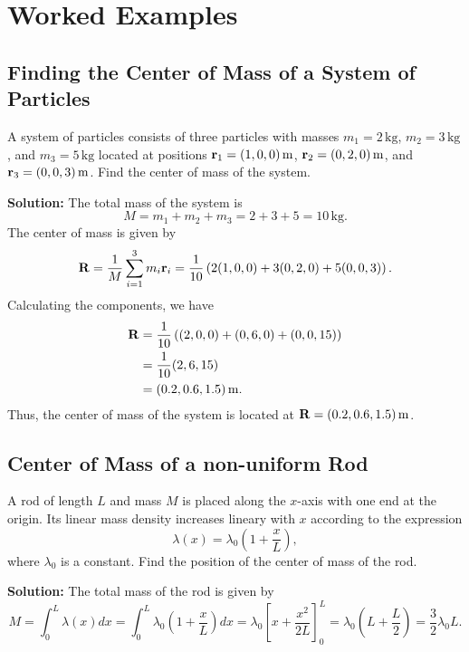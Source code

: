 \documentclass[12pt]{article}
\begin{document}
\section{Worked Examples}
\subsection{Finding the Center of Mass of a System of Particles}
A system of particles consists of three particles with masses $m_1=2\,\mathrm{kg}$, $m_2=3\,\mathrm{kg}$, and $m_3=5\,\mathrm{kg}$ located at positions $\vb{r}_1=(1,0,0)\,\mathrm{m}$, $\vb{r}_2=(0,2,0)\,\mathrm{m}$, and $\vb{r}_3=(0,0,3)\,\mathrm{m}$. Find the center of mass of the system.

\textbf{Solution:}
The total mass of the system is
\begin{equation}
    M = m_1 + m_2 + m_3 = 2 + 3 + 5 = 10\,\mathrm{kg}.
\end{equation}
The center of mass is given by
\begin{equation}
    \vb{R} = \frac{1}{M}\sum_{i=1}^{3} m_i \vb{r}_i
    = \frac{1}{10}\left(2(1,0,0) + 3(0,2,0) + 5(0,0,3)\right).
\end{equation}
Calculating the components, we have
\begin{align}
    \vb{R} &= \frac{1}{10}\left((2,0,0) + (0,6,0) + (0,0,15)\right) \\
    &= \frac{1}{10}(2,6,15) \\
    &= (0.2, 0.6, 1.5)\,\mathrm{m}.
\end{align}
Thus, the center of mass of the system is located at $\vb{R} = (0.2, 0.6, 1.5)\,\mathrm{m}$.

\subsection{Center of Mass of a non-uniform Rod}
A rod of length $L$ and mass $M$ is placed along the $x$-axis with one end at the origin. Its linear mass density increases lineary with $x$ according to the expression
\[
    \lambda(x) = \lambda_0 \left(1 + \frac{x}{L}\right),
\]
where $\lambda_0$ is a constant. Find the position of the center of mass of the rod.

\textbf{Solution:}
The total mass of the rod is given by
\begin{equation}
    M = \int_0^L \lambda(x) dx = \int_0^L \lambda_0 \left(1 + \frac{x}{L}\right) dx
    = \lambda_0 \left[ x + \frac{x^2}{2L} \right]_0^L
    = \lambda_0 \left( L + \frac{L}{2} \right) = \frac{3}{2} \lambda_0 L.
\end{equation}
\end{document}
